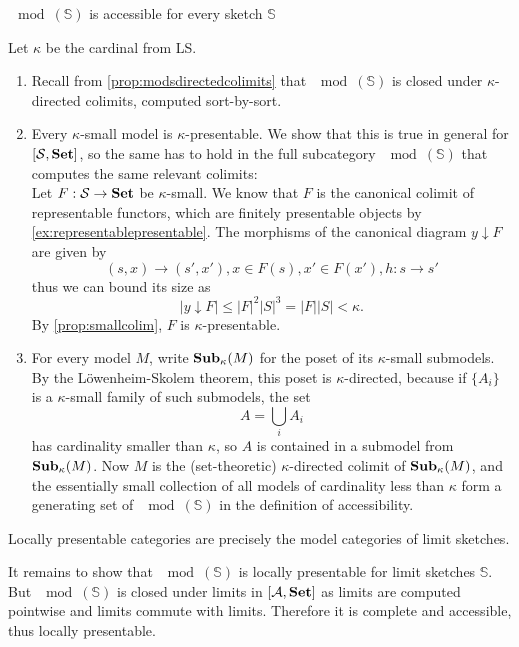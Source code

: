 \begin{Theorem}
$\mod(\mathbb S)$ is accessible for every sketch $\mathbb S$
\end{Theorem}
\begin{Proof}
Let $\kappa$ be the cardinal from LS.
\begin{enumerate}
\item Recall from \ref{prop:modsdirectedcolimits} that $\mod(\mathbb S)$ is closed under $\kappa$-directed colimits, computed sort-by-sort.
\item Every $\kappa$-small model is $\kappa$-presentable. We show that this is true in general for $[\mathcal{S},\mathbf{Set}]$, so the same has to hold in the full subcategory $\mod(\mathbb S)$ that computes the same relevant colimits: \\

Let $F : \mathcal{S} \to \mathbf{Set}$ be $\kappa$-small. We know that $F$ is the canonical colimit of representable functors, which are finitely presentable objects by \ref{ex:representablepresentable}. The morphisms of the canonical diagram $y \downarrow F$ are given by \[ (s,x) \to (s',x'), x \in F(s), x' \in F(x'), h : s \to s' \]
thus we can bound its size as
\[ |y \downarrow F| \leq |F|^2|S|^3 = |F||S| < \kappa. \]
By \ref{prop:smallcolim}, $F$ is $\kappa$-presentable.

\item For every model $M$, write $\mathbf{Sub}_\kappa(M)$ for the poset of its $\kappa$-small submodels. By the Löwenheim-Skolem theorem, this poset is $\kappa$-directed, because if $\{A_i\}$ is a $\kappa$-small family of such submodels, the set
\[ A = \bigcup_i A_i \]
has cardinality smaller than $\kappa$, so $A$ is contained in a submodel from $\mathbf{Sub}_\kappa(M)$. Now $M$ is the (set-theoretic) $\kappa$-directed colimit of $\mathbf{Sub}_\kappa(M)$, and the essentially small collection of all models of cardinality less than $\kappa$ form a generating set of $\mod(\mathbb S)$ in the definition of accessibility.
\end{enumerate}
\end{Proof}



\begin{Corollary}
Locally presentable categories are precisely the model categories of limit sketches.
\end{Corollary}
\begin{Proof}
It remains to show that $\mod(\mathbb S)$ is locally presentable for limit sketches $\mathbb S$. But $\mod(\mathbb S)$ is closed under limits in $[\mathcal{A},\mathbf{Set}]$ as limits are computed pointwise and limits commute with limits. Therefore it is complete and accessible, thus locally presentable.
\end{Proof}